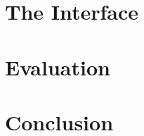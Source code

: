 

% 

%







\section{The \Tool Interface}
\label{sec:ide}


\section{Evaluation}



% 

\section{Conclusion}



